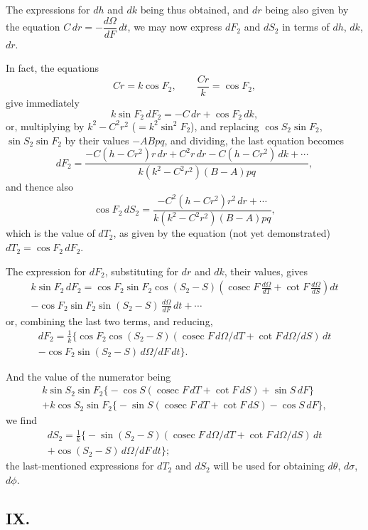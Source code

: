 \documentclass[11pt,a4paper]{article}
\DeclareMathOperator{\cosec}{cosec}
\begin{document}
The expressions for $dh$ and $dk$ being thus obtained, and $dr$ being also given by the equation $C\,dr = -\dfrac{d\Omega}{dF}\,dt$, we may now express $dF_2$ and $dS_2$ in terms of $dh$, $dk$, $dr$.

In fact, the equations
\[
Cr = k\cos F_2, \qquad \frac{Cr}{k} = \cos F_2,
\]
give immediately
\[
k\sin F_2\,dF_2 = -C\,dr + \cos F_2\,dk,
\]
or, multiplying by $k^2 - C^2r^2$ ($= k^2\sin^2 F_2$), and replacing $\cos S_2\sin F_2$, $\sin S_2\sin F_2$ by their values $-ABpq$, and dividing, the last equation becomes
\[
dF_2 = \frac{-C(h-Cr^2)r\,dr + C^2r\,dr - C(h-Cr^2)\,dk + \cdots}{k(k^2-C^2r^2)(B-A)pq},
\]
and thence also
\[
\cos F_2\,dS_2 = \frac{-C^2(h-Cr^2)r^2\,dr + \cdots}{k(k^2-C^2r^2)(B-A)pq},
\]
which is the value of $dT_2$, as given by the equation (not yet demonstrated) $dT_2 = \cos F_2\,dF_2$.

The expression for $dF_2$, substituting for $dr$ and $dk$, their values, gives
\begin{multline*}
k\sin F_2\,dF_2 = \cos F_2\sin F_2\cos(S_2-S)\left(\cosec F\,\frac{d\Omega}{dT} + \cot F\,\frac{d\Omega}{dS}\right)dt \\
- \cos F_2\sin F_2\sin(S_2-S)\,\frac{d\Omega}{dF}\,dt + \cdots
\end{multline*}
or, combining the last two terms, and reducing,
\begin{multline*}
dF_2 = \frac{1}{k}\bigl\{\cos F_2\cos(S_2-S)(\cosec F\,d\Omega/dT + \cot F\,d\Omega/dS)\,dt \\
- \cos F_2\sin(S_2-S)\,d\Omega/dF\,dt\bigr\}.
\end{multline*}

And the value of the numerator being
\begin{multline*}
k\sin S_2\sin F_2\bigl\{-\cos S(\cosec F\,dT + \cot F\,dS) + \sin S\,dF\bigr\} \\
+ k\cos S_2\sin F_2\bigl\{-\sin S(\cosec F\,dT + \cot F\,dS) - \cos S\,dF\bigr\},
\end{multline*}
we find
\begin{multline*}
dS_2 = \frac{1}{k}\bigl\{-\sin(S_2-S)(\cosec F\,d\Omega/dT + \cot F\,d\Omega/dS)\,dt \\
+ \cos(S_2-S)\,d\Omega/dF\,dt\bigr\};
\end{multline*}
the last-mentioned expressions for $dT_2$ and $dS_2$ will be used for obtaining $d\theta$, $d\sigma$, $d\phi$.

\subsection*{IX.}
\end{document}
